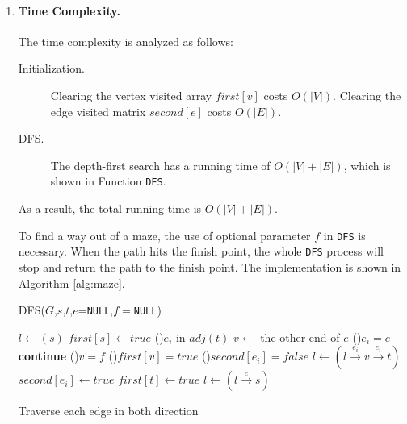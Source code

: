 \documentclass[12pt,a4paper]{article}
\makeatletter
\newtheorem*{solution}{Solution}
\theoremstyle{definition}
\renewenvironment{solution}[1][Solution] {\par\pushQED{\qed}\normalfont\topsep6\p@\@plus6\p@\relax\trivlist\item[\hskip\labelsep\bfseries#1\@addpunct{.}]\ignorespaces}{\popQED\endtrivlist\@endpefalse} \makeatother
\makeatother
\begin{document}
\begin{enumerate}
\begin{solution}
        \paragraph{Time Complexity.} The time complexity is analyzed as follows:
        \begin{description}
            \item[Initialization.] Clearing the vertex visited array $first[v]$ costs $O(|V|)$. Clearing the edge visited matrix $second[e]$ costs $O(|E|)$.
            \item[DFS.] The depth-first search has a running time of $O(|V|+|E|)$, which is shown in Function \texttt{DFS}.
        \end{description}
        As a result, the total running time is $O(|V|+|E|)$.

        To find a way out of a maze, the use of optional parameter $f$ in \texttt{DFS} is necessary. When the path hits the finish point, the whole \texttt{DFS} process will stop and return the path to the finish point. The implementation is shown in Algorithm \ref{alg:maze}.
    \begin{function}[!htbp]
        \caption{DFS($G$,$s$,$t$,$e$=\texttt{NULL},$f=$\texttt{NULL})}
        \BlankLine
            $l\leftarrow (s)$\;
        $first[s]\leftarrow true$\;
        \ForEach(){$e_i$ in $adj(t)$}{
            $v\leftarrow$ the other end of $e$\;
            \lIf(){$e_i=e$}{\textbf{continue}}
            \lIf(){$v=f$}{}
            \If(){$first[v]=true$}{
                \If(){$second[e_i]=false$}{ $l\leftarrow (l \stackrel{e_i}{\rightarrow} v\stackrel{e_i}{\rightarrow} t)$\;
                $second[e_i]\leftarrow true$\;
                }
            }
        }
        $first[t]\leftarrow true$\;
        $l\leftarrow (l\stackrel{e}{\rightarrow} s)$\;
        \;
    \end{function}
    \begin{algorithm}[!htbp]
        \caption{Traverse each edge in both direction}

\end{algorithm}
\end{solution}
\end{enumerate}
\end{document}
